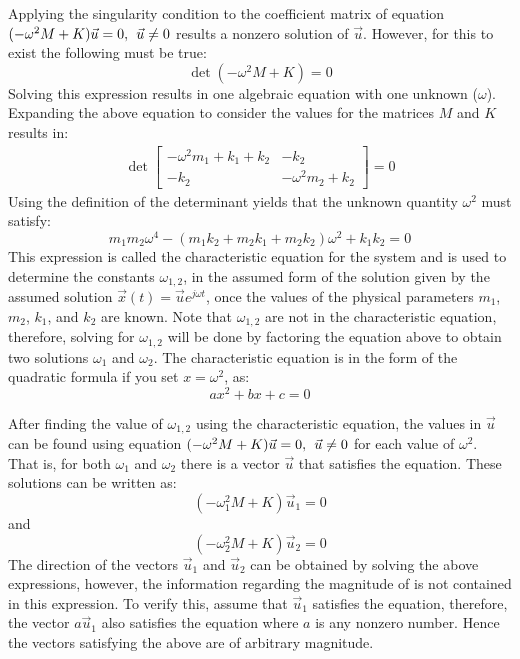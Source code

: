 \documentclass[12pt,letter]{article}
\begin{document}
	Applying the singularity condition to the coefficient matrix of equation $(-\omega^2 M  + K)\vec{u} =0, \hspace{1ex} \vec{u}\neq0$ results a nonzero solution of $\vec{u}$. However, for this to exist the following must be true:
	\begin{equation}
	\det(-\omega^2 M  + K) = 0
	\end{equation}
	Solving this expression results in one algebraic equation with one unknown ($\omega$). Expanding the above equation to consider the values for the matrices $M$ and $K$ results in:
	\begin{eqnarray}
	\det\begin{bmatrix} -\omega^2 m_1 + k_1 + k_2 & -k_2  \\  -k_2 & -\omega^2 m_2 + k_2 \end{bmatrix}=0
	\end{eqnarray}
	Using the definition of the determinant yields that the unknown quantity $\omega^2$ must satisfy:
	\begin{equation}
	m_1 m_2 \omega^4 - (m_1 k_2 + m_2 k_1 + m_2 k_2)\omega^2 + k_1 k_2 = 0
	\label{eq:characteristic_equation}
	\end{equation}
	This expression is called the characteristic equation for the system and is used to determine the constants $\omega_{1,2}$, in the assumed form of the solution given by the assumed solution $\vec{x}(t) = \vec{u}e^{j\omega t}$, once the values of the physical parameters $m_1$, $m_2$, $k_1$, and $k_2$ are known. Note that $\omega_{1,2}$ are not in the characteristic equation, therefore, solving for $\omega_{1,2}$  will be done by factoring the equation above to obtain two solutions $\omega_1$ and $\omega_2$. The characteristic equation is in the form of the quadratic formula if you set $x=\omega^2$, as:
	\begin{equation}
	ax^2 + bx +c = 0
	\end{equation}
	
	After finding the value of $\omega_{1,2}$ using the characteristic equation, the values in $\vec{u}$ can be found using equation $(-\omega^2 M  + K)\vec{u} =0, \hspace{1ex} \vec{u}\neq0$ for each value of $\omega^2$. That is, for both $\omega_1$ and $\omega_2$ there is a vector  $\vec{u}$ that satisfies the equation. These solutions can be written as:
	\begin{equation}
		(-\omega_1^2 M  + K)\vec{u}_1 =0
	\end{equation}
	and 
	\begin{equation}
		(-\omega_2^2 M  + K)\vec{u}_2 =0
	\end{equation}
	The direction of the vectors $\vec{u}_1$ and $\vec{u}_2$ can be obtained by solving the above expressions, however, the information regarding the magnitude of is not contained in this expression. To verify this, assume that $\vec{u}_1$ satisfies the equation, therefore, the vector $a\vec{u}_1$ also satisfies the equation where $a$ is any nonzero number. Hence the vectors satisfying the above are of arbitrary magnitude.
	 
\end{document}
